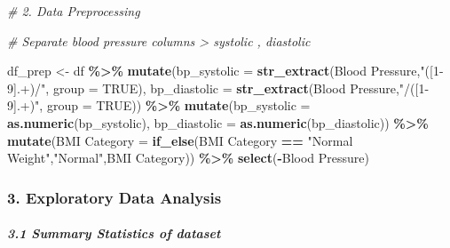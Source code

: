 \documentclass[
]{article}
\newenvironment{Shaded}{\begin{snugshade}}{\end{snugshade}}
\newcommand{\AttributeTok}[1]{\textcolor[rgb]{0.13,0.29,0.53}{#1}}
\newcommand{\CommentTok}[1]{\textcolor[rgb]{0.56,0.35,0.01}{\textit{#1}}}
\newcommand{\ConstantTok}[1]{\textcolor[rgb]{0.56,0.35,0.01}{#1}}
\newcommand{\FunctionTok}[1]{\textcolor[rgb]{0.13,0.29,0.53}{\textbf{#1}}}
\newcommand{\NormalTok}[1]{#1}
\newcommand{\OtherTok}[1]{\textcolor[rgb]{0.56,0.35,0.01}{#1}}
\newcommand{\SpecialCharTok}[1]{\textcolor[rgb]{0.81,0.36,0.00}{\textbf{#1}}}
\newcommand{\StringTok}[1]{\textcolor[rgb]{0.31,0.60,0.02}{#1}}
\begin{document}
\begin{Shaded}
\begin{Highlighting}[]
\CommentTok{\# 2. Data Preprocessing }

\CommentTok{\# Separate blood pressure columns \textgreater{} systolic , diastolic}

\NormalTok{df\_prep }\OtherTok{\textless{}{-}}\NormalTok{ df }\SpecialCharTok{\%\textgreater{}\%}
  \FunctionTok{mutate}\NormalTok{(}\AttributeTok{bp\_systolic =} \FunctionTok{str\_extract}\NormalTok{(}\StringTok{\textasciigrave{}}\AttributeTok{Blood Pressure}\StringTok{\textasciigrave{}}\NormalTok{,}\StringTok{"([1{-}9].+)/"}\NormalTok{, }\AttributeTok{group =} \ConstantTok{TRUE}\NormalTok{),}
         \AttributeTok{bp\_diastolic =} \FunctionTok{str\_extract}\NormalTok{(}\StringTok{\textasciigrave{}}\AttributeTok{Blood Pressure}\StringTok{\textasciigrave{}}\NormalTok{,}\StringTok{"/([1{-}9].+)"}\NormalTok{, }\AttributeTok{group =} \ConstantTok{TRUE}\NormalTok{)) }\SpecialCharTok{\%\textgreater{}\%}
  \FunctionTok{mutate}\NormalTok{(}\AttributeTok{bp\_systolic =} \FunctionTok{as.numeric}\NormalTok{(bp\_systolic),}
         \AttributeTok{bp\_diastolic =} \FunctionTok{as.numeric}\NormalTok{(bp\_diastolic)) }\SpecialCharTok{\%\textgreater{}\%}
  \FunctionTok{mutate}\NormalTok{(}\StringTok{\textasciigrave{}}\AttributeTok{BMI Category}\StringTok{\textasciigrave{}} \OtherTok{=} \FunctionTok{if\_else}\NormalTok{(}\StringTok{\textasciigrave{}}\AttributeTok{BMI Category}\StringTok{\textasciigrave{}} \SpecialCharTok{==} \StringTok{"Normal Weight"}\NormalTok{,}\StringTok{"Normal"}\NormalTok{,}\StringTok{\textasciigrave{}}\AttributeTok{BMI Category}\StringTok{\textasciigrave{}}\NormalTok{)) }\SpecialCharTok{\%\textgreater{}\%}
  \FunctionTok{select}\NormalTok{(}\SpecialCharTok{{-}}\StringTok{\textasciigrave{}}\AttributeTok{Blood Pressure}\StringTok{\textasciigrave{}}\NormalTok{)}
\end{Highlighting}
\end{Shaded}

\hypertarget{exploratory-data-analysis}{%
\subsubsection{\texorpdfstring{\textbf{3. Exploratory Data
Analysis}}{3. Exploratory Data Analysis}}\label{exploratory-data-analysis}}

\hypertarget{summary-statistics-of-dataset}{%
\subparagraph{3.1 Summary Statistics of
dataset}\label{summary-statistics-of-dataset}}
\end{document}
